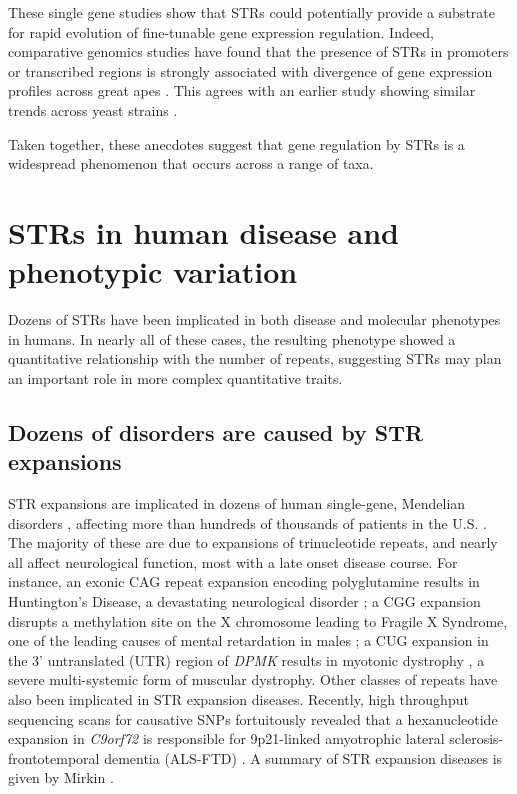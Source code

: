 These single gene studies show that STRs could potentially provide a substrate for rapid evolution of fine-tunable gene expression regulation. Indeed, comparative genomics studies have found that the presence of STRs in promoters or transcribed regions is strongly associated with divergence of gene expression profiles across great apes \cite{SonayCarvalhoRobinsonEtAl2015}. This agrees with an earlier study showing similar trends across yeast strains \cite{VincesLegendreCaldaraEtAl2009}. 

Taken together, these anecdotes suggest that gene regulation by STRs is a widespread phenomenon that occurs across a range of taxa.

\section{STRs in human disease and phenotypic variation}
Dozens of STRs have been implicated in both disease and molecular phenotypes in humans. In nearly all of these cases, the resulting phenotype showed a quantitative relationship with the number of repeats, suggesting STRs may plan an important role in more complex quantitative traits.

\subsection{Dozens of disorders are caused by STR expansions}
STR expansions are implicated in dozens of human single-gene, Mendelian disorders \cite{Mirkin2007}, affecting more than hundreds of thousands of patients in the U.S. \cite{CoffeeKeithAlbizuaEtAl2009}. The majority of these are due to expansions of trinucleotide repeats, and nearly all affect neurological function, most with a late onset disease course. For instance, an exonic CAG repeat expansion encoding polyglutamine results in Huntington's Disease, a devastating neurological disorder \cite{Mirkin2007}; a CGG expansion disrupts a methylation site on the X chromosome leading to Fragile X Syndrome, one of the leading causes of mental retardation in males \cite{LyonLaverYuEtAl2010}; a CUG expansion in the 3' untranslated (UTR) region of \emph{DPMK} results in myotonic dystrophy \cite{BrookMcCurrachHarleyEtAl1992}, a severe multi-systemic form of muscular dystrophy. Other classes of repeats have also been implicated in STR expansion diseases. Recently, high throughput sequencing scans for causative SNPs fortuitously revealed that a hexanucleotide expansion in \emph{C9orf72} is responsible for 9p21-linked amyotrophic lateral sclerosis-frontotemporal dementia (ALS-FTD) \cite{RentonMajounieWaiteEtAl}. A summary of STR expansion diseases is given by Mirkin \cite{Mirkin2007}. %

